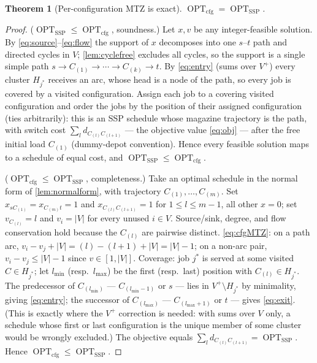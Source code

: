 \documentclass[11pt,a4paper]{article}
\theoremstyle{plain}
\newtheorem{theorem}{Theorem}[section]
\theoremstyle{definition}
\DeclareMathOperator{\OPT}{OPT}
\newcommand{\OSSP}{\OPT_{\mathrm{SSP}}}
\begin{document}
\begin{thmbox}
	\begin{theorem}[Per-configuration MTZ is exact]
		\label{thm:perconfig}
		$\OPT_{\mathrm{cfg}}=\OSSP$.
	\end{theorem}
\end{thmbox}
\begin{proofbox}
	\begin{proof}
		($\OSSP\le\OPT_{\mathrm{cfg}}$, soundness.) Let $x,v$ be any integer-feasible
		solution. By \eqref{eq:source}--\eqref{eq:flow} the support of $x$ decomposes into one
		$s$--$t$ path and directed cycles in $V$; \cref{lem:cyclefree} excludes all cycles, so
		the support is a single simple path $s\to C_{(1)}\to\cdots\to C_{(k)}\to t$. By
		\eqref{eq:entry} (sums over $V^{+}$) every cluster $H_{j^{*}}$ receives an arc, whose
		head is a node of the path, so every job is covered by a visited configuration. Assign
		each job to a covering visited configuration and order the jobs by the position of
		their assigned configuration (ties arbitrarily): this is an SSP schedule whose magazine
		trajectory is the path, with switch cost
		$\sum_{l}d_{C_{(l)}C_{(l+1)}}$ --- the objective value \eqref{eq:obj} --- after the free
		initial load $C_{(1)}$ (dummy-depot convention). Hence every feasible solution maps to
		a schedule of equal cost, and $\OSSP\le\OPT_{\mathrm{cfg}}$.

		($\OPT_{\mathrm{cfg}}\le\OSSP$, completeness.) Take an optimal schedule in the normal
		form of \cref{lem:normalform}, with trajectory $C_{(1)},\dots,C_{(m)}$. Set
		$x_{sC_{(1)}}=x_{C_{(m)}t}=1$ and $x_{C_{(l)}C_{(l+1)}}=1$ for $1\le l\le m-1$, all
		other $x=0$; set $v_{C_{(l)}}=l$ and $v_i=|V|$ for every unused $i\in V$.
		Source/sink, degree, and flow conservation hold because the $C_{(l)}$ are pairwise
		distinct. \eqref{eq:cfgMTZ}: on a path arc, $v_i-v_j+|V|=(l)-(l+1)+|V|=|V|-1$; on a
		non-arc pair, $v_i-v_j\le|V|-1$ since $v\in[1,|V|]$. Coverage: job $j^{*}$ is served at
		some visited $C\in H_{j^{*}}$; let $l_{\min}$ (resp.\ $l_{\max}$) be the first (resp.\
		last) position with $C_{(l)}\in H_{j^{*}}$. The predecessor of $C_{(l_{\min})}$ ---
		$C_{(l_{\min}-1)}$ or $s$ --- lies in $V^{+}\setminus H_{j^{*}}$ by minimality, giving
		\eqref{eq:entry}; the successor of $C_{(l_{\max})}$ --- $C_{(l_{\max}+1)}$ or $t$ ---
		gives \eqref{eq:exit}. (This is exactly where the $V^{+}$ correction is needed: with
		sums over $V$ only, a schedule whose first or last configuration is the unique member
		of some cluster would be wrongly excluded.) The objective equals
		$\sum_l d_{C_{(l)}C_{(l+1)}}=\OSSP$. Hence $\OPT_{\mathrm{cfg}}\le\OSSP$.
	\end{proof}
\end{proofbox}
\end{document}
